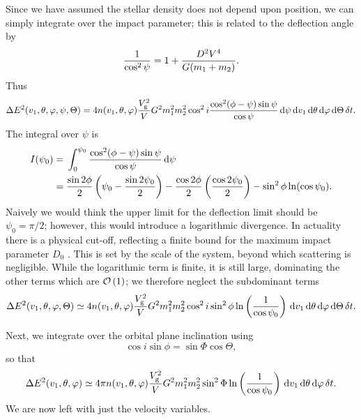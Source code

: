 Since we have assumed the stellar density does not depend upon position, we can simply integrate over the impact parameter; this is related to the deflection angle by
\begin{equation}
\frac{1}{\cos^2\psi} = 1 + \frac{D^2V^4}{G(m_1 + m_2)}.
\end{equation}
Thus
\begin{equation}
\Delta E^2(v_1,\theta,\varphi,\psi,\Theta) =  4 n(v_1,\theta,\varphi)\frac{V_\mathrm{g}^2}{V}G^2m_1^2 m_2^2\cos^2i\frac{\cos^2(\phi-\psi)\sin\psi}{\cos\psi} \,\mathrm{d} \psi\,\mathrm{d} v_1\,\mathrm{d}\theta\,\mathrm{d}\varphi\,\mathrm{d}\Theta\,\delta t.
\end{equation}
The integral over $\psi$ is
\begin{align}
I(\psi_0) = {} & \int_{0}^{\psi_0}{\frac{\cos^2(\phi-\psi)\sin\psi}{\cos\psi}}\,\mathrm{d}{\psi}\\
 = {} & \frac{\sin 2\phi}{2}\left(\psi_0 - \frac{\sin 2\psi_0}{2}\right) - \frac{\cos 2\phi}{2}\left(\frac{\cos 2\psi_0}{2}\right) - \sin^2\phi\ln(\cos\psi_0).
\end{align}
Naively we would think the upper limit for the deflection limit should be $\psi_0 = \pi/2$; however, this would introduce a logarithmic divergence. In actuality there is a physical cut-off, reflecting a finite bound for the maximum impact parameter $D_0$ \citep{Weinberg1986}. This is set by the scale of the system, beyond which scattering is negligible. While the logarithmic term is finite, it is still large, dominating the other terms which are $\mathcal{O}\left({1}\right)$; we therefore neglect the subdominant terms
\begin{equation}
\Delta E^2(v_1,\theta,\varphi,\Theta) \simeq  4 n(v_1,\theta,\varphi)\frac{V_\mathrm{g}^2}{V}G^2m_1^2 m_2^2\cos^2i\sin^2\phi\ln\left(\frac{1}{\cos\psi_0}\right)\,\mathrm{d} v_1\,\mathrm{d}\theta\,\mathrm{d}\varphi\,\mathrm{d}\Theta\,\delta t.
\end{equation}

Next, we integrate over the orbital plane inclination using
\begin{equation}
\cos i\sin\phi = \sin\Phi\cos\Theta,
\end{equation}
so that
\begin{equation}
\Delta E^2(v_1,\theta,\varphi) \simeq  4\pi n(v_1,\theta,\varphi)\frac{V_\mathrm{g}^2}{V}G^2m_1^2 m_2^2\sin^2\Phi\ln\left(\frac{1}{\cos\psi_0}\right)\,\mathrm{d} v_1\,\mathrm{d}\theta\,\mathrm{d}\varphi\,\delta t.
\end{equation}
We are now left with just the velocity variables.

